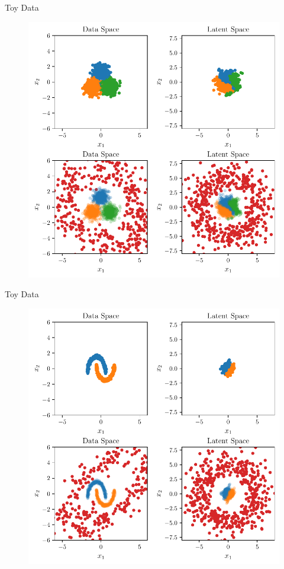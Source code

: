 \documentclass[aspectratio=169]{beamer}
\begin{document}
\begin{frame}{Toy Data}
    \begin{figure}
        \includegraphics[height=0.7\textheight]{beamer-figures/toy_example/gaussian_mixture/latent_mapping.pdf}
    \end{figure}
\end{frame}
\begin{frame}{Toy Data}
    \begin{figure}
        \includegraphics[height=0.7\textheight]{beamer-figures/toy_example/moons/latent_mapping.pdf}
    \end{figure}
\end{frame}
\end{document}
